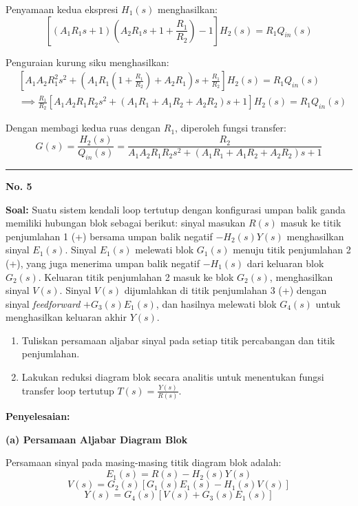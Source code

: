 \documentclass[11pt,a4paper]{article}
\begin{document}
Penyamaan kedua ekspresi $H_1(s)$ menghasilkan:
$$\left[ (A_1 R_1 s + 1)\left( A_2 R_1 s + 1 + \frac{R_1}{R_2} \right) - 1 \right] H_2(s) = R_1 Q_{in}(s)$$

Penguraian kurung siku menghasilkan:
\begin{align*}
    &\left[ A_1 A_2 R_1^2 s^2 + \left( A_1 R_1\left(1 + \frac{R_1}{R_2}\right) + A_2 R_1 \right) s + \frac{R_1}{R_2} \right] H_2(s) = R_1 Q_{in}(s) \\
    &\implies \frac{R_1}{R_2} \left[ A_1 A_2 R_1 R_2 s^2 + (A_1 R_1 + A_1 R_2 + A_2 R_2) s + 1 \right] H_2(s) = R_1 Q_{in}(s)
\end{align*}

Dengan membagi kedua ruas dengan $R_1$, diperoleh fungsi transfer:
$$G(s) = \frac{H_2(s)}{Q_{in}(s)} = \frac{R_2}{A_1 A_2 R_1 R_2 s^2 + (A_1 R_1 + A_1 R_2 + A_2 R_2) s + 1}$$

\vspace{12pt}
\hrule
\vspace{10pt}

\textbf{\large No. 5}

\textbf{Soal:}  
Suatu sistem kendali loop tertutup dengan konfigurasi umpan balik ganda memiliki hubungan blok sebagai berikut: sinyal masukan $R(s)$ masuk ke titik penjumlahan 1 (+) bersama umpan balik negatif $-H_2(s) Y(s)$ menghasilkan sinyal $E_1(s)$. Sinyal $E_1(s)$ melewati blok $G_1(s)$ menuju titik penjumlahan 2 (+), yang juga menerima umpan balik negatif $-H_1(s)$ dari keluaran blok $G_2(s)$. Keluaran titik penjumlahan 2 masuk ke blok $G_2(s)$, menghasilkan sinyal $V(s)$. Sinyal $V(s)$ dijumlahkan di titik penjumlahan 3 (+) dengan sinyal \textit{feedforward} $+G_3(s) E_1(s)$, dan hasilnya melewati blok $G_4(s)$ untuk menghasilkan keluaran akhir $Y(s)$.
\begin{enumerate}[label=(\alph*)]
    \item Tuliskan persamaan aljabar sinyal pada setiap titik percabangan dan titik penjumlahan.
    \item Lakukan reduksi diagram blok secara analitis untuk menentukan fungsi transfer loop tertutup $T(s) = \frac{Y(s)}{R(s)}$.
\end{enumerate}

\textbf{Penyelesaian:}

\textbf{(a) Persamaan Aljabar Diagram Blok}

Persamaan sinyal pada masing-masing titik diagram blok adalah:
$$E_1(s) = R(s) - H_2(s) Y(s)$$
$$V(s) = G_2(s) \left[ G_1(s) E_1(s) - H_1(s) V(s) \right]$$
$$Y(s) = G_4(s) \left[ V(s) + G_3(s) E_1(s) \right]$$
\end{document}
